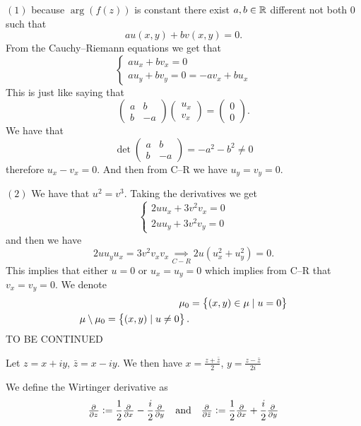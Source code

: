 \documentclass[11pt,a4paper]{article}
\begin{document}
\begin{solution}
  $(1)$ because $\arg(f(z))$ is constant there exist $a,b \in \mathbb{R}$ different
  not both $0$ such that
  \[
    a u(x,y) + b v(x,y) = 0.
  \]
  From the Cauchy--Riemann equations we get that
  \[
    \begin{cases}
      a u_x + b v_x = 0 \\
      a u_y + b v_y = 0 = - a v_x + b u_x
    \end{cases}
  \]
  This is just like saying that
  \[
    \begin{pmatrix}
      a & b \\
      b & -a
    \end{pmatrix}
    \begin{pmatrix}
      u_x \\
      v_x
    \end{pmatrix} =
    \begin{pmatrix}
      0 \\
      0
    \end{pmatrix}.
  \]
  We have that
  \[
    \det 
    \begin{pmatrix}
      a & b \\
      b & -a
    \end{pmatrix} =
    - a^2 - b^2 \neq 0
  \]
  therefore $u_x - v_x = 0$.
  And then from C--R we have $u_y = v_y = 0$.

  $(2)$ We have that $u^2 = v^3$.
  Taking the derivatives we get
  \[
    \begin{cases}
      2 u u_x + 3 v^2 v_x = 0 \\
      2 u u_y + 3 v^2 v_y = 0
    \end{cases}
  \]
  and then we have
  \[
    2 u u_y u_x = 3 v^2 v_x v_x \underset{C-R}{\implies}
    2 u (u_x^2 + u_y^2) = 0.
  \]
  This implies that either $u = 0$ or $u_x = u_y = 0$ which implies from C--R
  that $v_x = v_y = 0$.
  We denote
  \begin{align*}
    \mu_0 &= \set{(x,y) \in \mu \mid u = 0} \\
    \mu \setminus \mu_0 = \set{(x,y) \mid u \neq 0}.
  \end{align*}
  TO BE CONTINUED
\end{solution}

Let $z = x + i y$, $\bar z = x - i y$.
We then have $x = \frac{z + \bar z}{2}$, $y = \frac{z - \bar z}{2i}$

\begin{definition}
  We define the Wirtinger derivative as
  \[
    \pd{}{z} :=
    \half \pd{}{x} - \frac{i}{2} \pd{}{y} \tand
    \pd{}{\bar z} :=
    \half \pd{}{x} + \frac{i}{2} \pd{}{y}
  \]
\end{definition}
\end{document}
